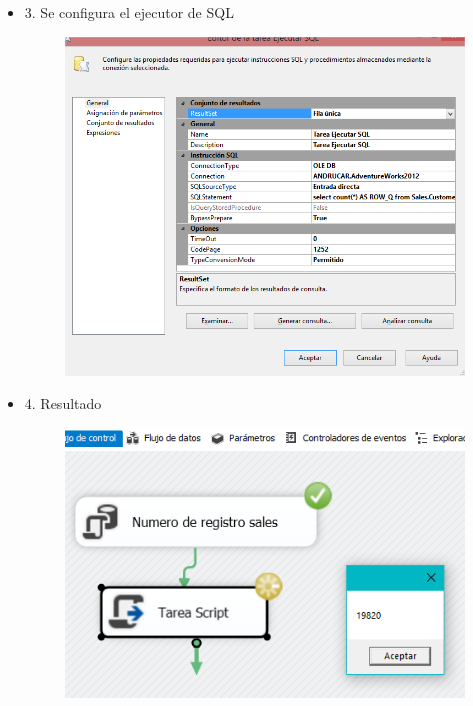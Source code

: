 \begin{itemize}
	\item3. Se configura el ejecutor de SQL
		\begin{figure}[H]
		\begin{center}
		\includegraphics[width=18cm]{./Imagenes/imagen3}
		\end{center}
		\end{figure}
     
	\item 4. Resultado
		\begin{figure}[H]
		\begin{center}
		\includegraphics[width=18cm]{./Imagenes/imagen4}
		\end{center}
		\end{figure}
     

\end{itemize}
